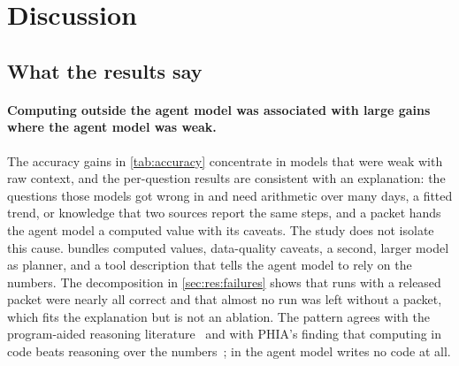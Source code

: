\section{Discussion}\label{sec:discussion}

\subsection{What the results say}

\paragraph{Computing outside the agent model was associated with large gains where the agent model was weak.} The
accuracy gains in \cref{tab:accuracy} concentrate in models that were weak with raw context, and the per-question
results are consistent with an explanation: the questions those models got wrong in \CA{} and \CB{} need arithmetic
over many days, a fitted trend, or knowledge that two sources report the same steps, and a packet hands the agent
model a computed value with its caveats. The study does not isolate this cause. \CC{} bundles computed values,
data-quality caveats, a second, larger model as planner, and a tool description that tells the agent model to rely
on the numbers. The decomposition in \cref{sec:res:failures} shows that runs with a released packet were nearly all correct and that almost no run was left without a packet, which fits the explanation but is not an
ablation. The pattern agrees with
the program-aided reasoning literature~\citep{gao2022pal,chen2023pot} and with PHIA's finding that computing in code
beats reasoning over the numbers~\citep{merrill2024phia}; in \sys{} the agent model writes no code at all.

